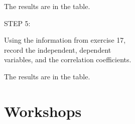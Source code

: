 \documentclass[11pt]{book}\usepackage[]{graphicx}\usepackage[]{color}
\begin{document}
\begin{exercises}
\begin{exercise}
    \end{exercise}
    \vspace{2mm}
    \begin{solution}    %

      The results are in the table.

    \end{solution}

  \begin{exercise} %

    STEP 5:

    Using the information from exercise 17, \\  record the independent, dependent \\ variables, and the correlation coefficients.



    \end{exercise}
    \begin{solution}    %

  The results are in the table.


    \end{solution}


\end{exercises}

\onecolumn



\chapter{Workshops}
\label{chap:ch17}

\end{document}
